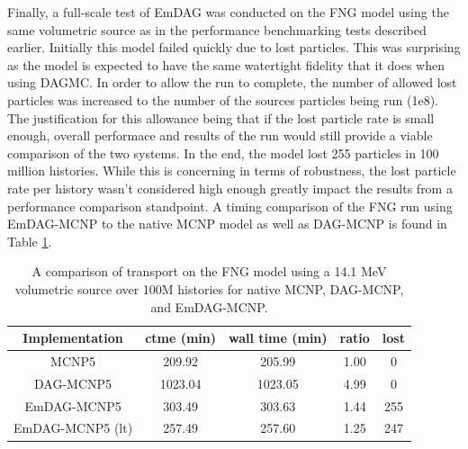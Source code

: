 \documentclass[12pt, a4paper]{article}
\begin{document}
Finally, a full-scale test of EmDAG was conducted on the FNG model using the same volumetric source as in the performance benchmarking tests described earlier. Initially this model failed quickly due to lost particles. This was surprising as the model is expected to have the same watertight fidelity that it does when using DAGMC. In order to allow the run to complete, the number of allowed lost particles was increased to the number of the sources particles being run (1e8). The justification for this allowance being that if the lost particle rate is small enough, overall performace and results of the run would still provide a viable comparison of the two systems. In the end, the model lost 255 particles in 100 million histories. While this is concerning in terms of robustness, the lost particle rate per history wasn't considered high enough greatly impact the results from a performance comparison standpoint. A timing comparison of the FNG run using EmDAG-MCNP to the native MCNP model as well as DAG-MCNP is found in Table \ref{fngemdag}.


\begin{table}[H]
  \small
  \begin{center}
        \begin{tabular}{|c|c|c|c|c|}
      \hline
      \textbf{Implementation} & \textbf{ctme (min)} & \textbf{wall time (min)} & \textbf{ratio} & \textbf{lost} \\
      \hline
      MCNP5 & 209.92 & 205.99 &  1.00 & 0 \\
      \hline
      DAG-MCNP5 & 1023.04 & 1023.05 & 4.99 & 0  \\
      \hline
      EmDAG-MCNP5 & 303.49 & 303.63 & 1.44 & 255  \\
      \hline
      EmDAG-MCNP5 (lt) & 257.49 & 257.60  & 1.25 & 247 \\
      \hline
    \end{tabular} 
    \caption{A comparison of transport on the FNG model using a 14.1 MeV volumetric source over 100M histories for native MCNP, DAG-MCNP, and EmDAG-MCNP.}
    \label{fngemdag}
  \end{center}
\end{table}
\end{document}
